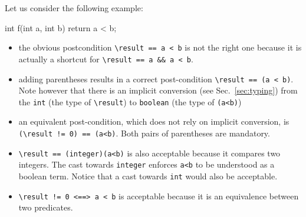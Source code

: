 Let us consider the following example:
\begin{listing-nonumber}
  int f(int a, int b) { return a < b; }
\end{listing-nonumber}
\begin{itemize}
\item the obvious postcondition \lstinline[style=c]|\result == a < b|
  is not the right one because it is actually a shortcut for
  \lstinline[style=c]|\result == a && a < b|.
\item adding parentheses results in a correct post-condition
  \lstinline[style=c]|\result == (a < b)|. 
Note however that there is an implicit
  conversion (see Sec.~\ref{sec:typing})
  from the \lstinline[style=c]|int| (the type of \lstinline[style=c]|\result|) to
  \lstinline[style=c]|boolean| (the type of \lstinline[style=c]|(a<b)|)
\item an equivalent post-condition, which does not rely on implicit
  conversion, is \lstinline[style=c]|(\result != 0) == (a<b)|. Both pairs of
  parentheses are mandatory.
\item \lstinline[style=c]|\result == (integer)(a<b)| is also acceptable because it compares
  two integers. The cast towards \lstinline[style=c]|integer| enforces
  \lstinline[style=c]|a<b| to be understood as a boolean term. Notice that a cast
  towards \lstinline[style=c]|int| would also be acceptable.
\item \lstinline[style=c]|\result != 0 <==> a < b| is acceptable because it is an
  equivalence between two predicates.
\end{itemize}
